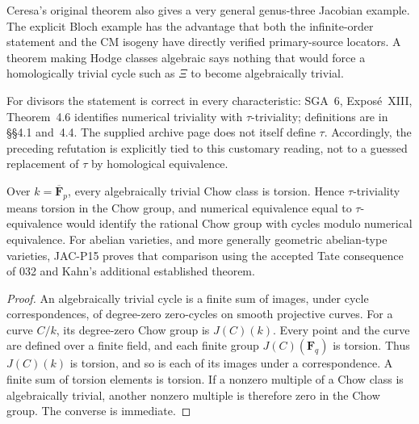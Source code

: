 Ceresa's original theorem also gives a very general genus-three
Jacobian example.  The explicit Bloch example has the advantage that
both the infinite-order statement and the CM isogeny have directly
verified primary-source locators.  A theorem making Hodge classes
algebraic says nothing that would force a homologically trivial
cycle such as $\Xi$ to become algebraically trivial.

For divisors the statement is correct in every characteristic:
SGA~6, Expos\'e~XIII, Theorem~4.6 identifies numerical triviality
with $\tau$-triviality; definitions are in \S\S4.1 and~4.4.
The supplied archive page does not itself define $\tau$.  Accordingly,
the preceding refutation is explicitly tied to this customary reading,
not to a guessed replacement of $\tau$ by homological equivalence.

\begin{lemma}
\label{jac:P06}
Over $k=\overline{\mathbf F}_p$, every algebraically trivial Chow class
is torsion.  Hence $\tau$-triviality means torsion in the Chow group,
and numerical equivalence equal to $\tau$-equivalence would identify
the rational Chow group with cycles modulo numerical equivalence.
For abelian varieties, and more generally geometric abelian-type
varieties, JAC-P15 proves that comparison using the accepted Tate
consequence of 032 and Kahn's additional established theorem.
\end{lemma}

\begin{proof}
An algebraically trivial cycle is a finite sum of images, under cycle
correspondences, of degree-zero zero-cycles on smooth projective curves.
For a curve $C/k$, its degree-zero Chow group is $J(C)(k)$.  Every
point and the curve are defined over a finite field, and each finite
group $J(C)(\mathbf F_q)$ is torsion.  Thus $J(C)(k)$ is torsion,
and so is each of its images under a correspondence.  A finite sum of
torsion elements is torsion.  If a nonzero multiple of a Chow class
is algebraically trivial, another nonzero multiple is therefore zero
in the Chow group.  The converse is immediate.
\end{proof}

